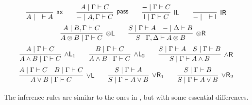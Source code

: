 \documentclass[submission,copyright,creativecommons]{eptcs}
\theoremstyle{definition}
\newcommand{\tl}{\otimes \mathsf{L}}
\newcommand{\tr}{\otimes \mathsf{R}}
\newcommand{\pass}{\mathsf{pass}}
\newcommand{\unitl}{\mathsf{IL}}
\newcommand{\unitr}{\mathsf{IR}}
\newcommand{\andlone}{\land \mathsf{L}_{1}}
\newcommand{\andltwo}{\land \mathsf{L}_{2}}
\newcommand{\andr}{\land \mathsf{R}}
\newcommand{\orl}{\lor \mathsf{L}}
\newcommand{\orrone}{\lor \mathsf{R}_{1}}
\newcommand{\orrtwo}{\lor \mathsf{R}_{2}}
\newcommand{\ax}{\mathsf{ax}}
\newcommand{\ot}{\otimes}
\newcommand{\I}{\mathsf{I}}
\newcommand{\NMILL}{$\mathtt{NMILL}$}
\begin{document}
\begin{equation}\label{eq:seqcalc}
  \def\arraystretch{2.5}
  \begin{array}{c}
    \infer[\ax]{A \mid \quad \vdash A}{}
    \qquad
    \infer[\pass]{{-} \mid A , \Gamma \vdash C}{A \mid \Gamma \vdash C}
    \qquad
    \infer[\unitl]{\I \mid \Gamma \vdash C}{{-} \mid \Gamma \vdash C}
    \qquad
    \infer[\unitr]{{-} \mid \quad \vdash \I}{}
    \\
    \qquad
    \infer[\tl]{A \ot B \mid \Gamma \vdash C}{A \mid B , \Gamma \vdash C}
    \qquad
    \infer[\tr]{S \mid \Gamma , \Delta \vdash A \ot B}{
      S \mid \Gamma \vdash A
      &
      {-} \mid \Delta \vdash B
    }
    \\
    \infer[\andlone]{A \land B \mid \Gamma \vdash C}{A \mid \Gamma \vdash C}
    \qquad
    \infer[\andltwo]{A \land B \mid \Gamma \vdash C}{B \mid \Gamma \vdash C}
    \qquad
    \infer[\andr]{S \mid \Gamma \vdash A \land B}{
      S \mid \Gamma \vdash A
      &
      S \mid \Gamma \vdash B
    }
    \\
    \infer[\orl]{A \lor B \mid \Gamma \vdash C}{
      A \mid \Gamma \vdash C
      &
      B \mid \Gamma \vdash C
    }
    \qquad
    \infer[\orrone]{S \mid \Gamma \vdash A \lor B}{S \mid \Gamma \vdash A}
    \qquad
    \infer[\orrtwo]{S \mid \Gamma \vdash A \lor B}{S \mid \Gamma \vdash B}
  \end{array}
\end{equation}
The inference rules are similar to the ones in  \cite{abrusci:noncommutative:1990}, but with some essential differences. 
\end{document}
